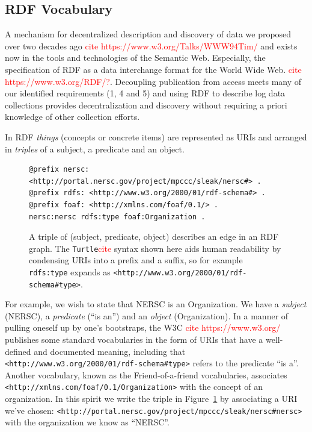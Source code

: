 \subsection{RDF Vocabulary}

A mechanism for decentralized description and discovery of data we proposed
over two decades ago \textcolor{red}{cite https://www.w3.org/Talks/WWW94Tim/} 
and exists now in the tools and technologies of the Semantic Web. Especially, 
the specification of RDF as a data interchange format for the World Wide 
Web. \textcolor{red}{cite https://www.w3.org/RDF/?}. Decoupling publication 
from access meets many of our identified requirements (1, 4 and 5) and 
using RDF to describe log data collections provides decentralization 
and discovery without requiring a priori knowledge of other collection 
efforts.

In RDF \emph{things} (concepts or concrete items) are represented as URIs
and arranged in \emph{triples} of a subject, a predicate and an object.  

\begin{figure}
\begin{verbatim}
@prefix nersc: <http://portal.nersc.gov/project/mpccc/sleak/nersc#> .
@prefix rdfs: <http://www.w3.org/2000/01/rdf-schema#> .
@prefix foaf: <http://xmlns.com/foaf/0.1/> .
nersc:nersc rdfs:type foaf:Organization .
\end{verbatim}

\caption{A triple of (subject, predicate, object) describes an edge 
in an RDF graph. The \texttt{Turtle}\textcolor{red}{cite} syntax shown
here aids human readability by condensing URIs into a prefix and a suffix,
so for example \texttt{rdfs:type} expands as
\texttt{<http://www.w3.org/2000/01/rdf-schema\#type>}.}
\label{f:rdftriples}
\end{figure}

For example, we wish to state that NERSC is an Organization. We have a 
\emph{subject} (NERSC), a \emph{predicate} (``is an'') and an \emph{object} 
(Organization). In a manner of pulling oneself up by one's bootstraps, the 
W3C \textcolor{red}{cite https://www.w3.org/} publishes some standard 
vocabularies in the form of URIs that have a well-defined and documented 
meaning, including that \texttt{<http://www.w3.org/2000/01/rdf-schema\#type>}
refers to the predicate ``is a''. Another vocabulary, known as the 
Friend-of-a-friend vocabularies, associates \texttt{<http://xmlns.com/foaf/0.1/Organization>} with the concept of an 
organization. In this spirit we write the triple in Figure~\ref{f:rdftriples}
by associating a URI we've chosen: \texttt{<http://portal.nersc.gov/project/mpccc/sleak/nersc\#nersc>} with the 
organization we know as ``NERSC''. 

